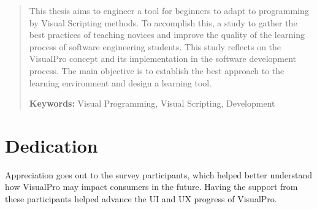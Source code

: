 \documentclass[12pt]{report} %
\begin{document}
\renewcommand\abstractname{\large\bfseries\filcenter\uppercase{Summary}}
\begin{abstract}
\thispagestyle{plain}
\setcounter{page}{3}
	
	This thesis aims to engineer a tool for beginners to adapt to programming by Visual Scripting methods. To accomplish this, a study to gather the best practices of teaching novices and improve the quality of the learning process of software engineering students. This study reflects on the VisualPro concept and its implementation in the software development process. The main objective is to establish the best approach to the learning environment and design a learning tool.

	\textbf{Keywords:} %
		Visual Programming, Visual Scripting, Development
	\vfill
\end{abstract}
	\newpage %
	\thispagestyle{empty}
	\mbox{}


\chapter*{Dedication}
	Appreciation goes out to the survey participants, which helped better understand how VisualPro may impact consumers in the future. Having the support from these participants helped advance the UI and UX progress of VisualPro.
	
\setcounter{page}{5}
	
	\vfill
	
	\newpage %
	\thispagestyle{empty}
	\mbox{}
	


\tableofcontents
\thispagestyle{fancy}

\newpage %
\thispagestyle{empty}
\mbox{}

\listoffigures
\thispagestyle{fancy}

\newpage %
\thispagestyle{empty}
\mbox{}

\listoftables
\thispagestyle{fancy}

\newpage %
\thispagestyle{empty}
\mbox{}


\clearpage
{} %
\end{document}
